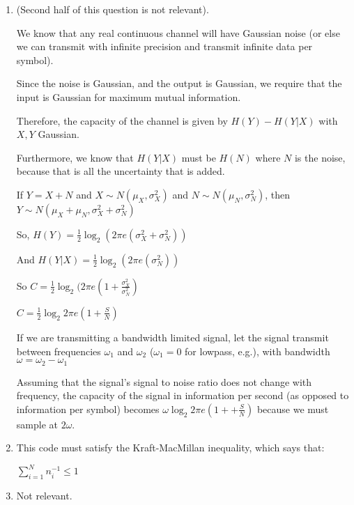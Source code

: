 


\begin{enumerate}[label=(\alph*)]

  \item
    (Second half of this question is not relevant).

    We know that any real continuous channel will have Gaussian noise (or else we can transmit with infinite precision and transmit infinite data per symbol).


    Since the noise is Gaussian, and the output is Gaussian, we require that the input is Gaussian for maximum mutual information.

    Therefore, the capacity of the channel is given by $H(Y) - H(Y|X)$ with $X,Y$ Gaussian.

    Furthermore, we know that $H(Y|X)$ must be $H(N)$ where $N$ is the noise, because that is all the uncertainty that is added.

    If $Y = X + N$ and $X \sim N(\mu_X, \sigma_X^2)$ and $N \sim N(\mu_N, \sigma_N^2)$, then $Y \sim N(\mu_X + \mu_N, \sigma_X^2 + \sigma_N^2)$

    So, $H(Y) =\frac{1}{2}\log_2 (2\pi e (\sigma_X^2 + \sigma_N^2))$

    And $H(Y|X) = \frac{1}{2}\log_2(2\pi e (\sigma_N^2))$

    So $C = \frac{1}{2}\log_2 (2\pi e (1 + \frac{\sigma_X^2}{\sigma_N^2})$

   $C = \frac{1}{2}\log_2 2\pi e (1 + \frac{S}{N})$

   If we are transmitting a bandwidth limited signal, let the signal transmit between frequencies $\omega_1$ and $\omega_2$ ($\omega_1 = 0$ for lowpass, e.g.), with bandwidth $\omega = \omega_2 - \omega_1$

   Assuming that the signal's signal to noise ratio does not change with frequency, the capacity of the signal in  information per second (as opposed to information per symbol) becomes $\omega \log_2 2\pi e (1 + + \frac{S}{N})$ because we must sample at $2\omega$.

   \item
     This code must satisfy the Kraft-MacMillan inequality, which says that:

     $\sum_{i=1}^N n_i^{-1} \leq 1$

     \item
       Not relevant.


        
    \end{enumerate}

